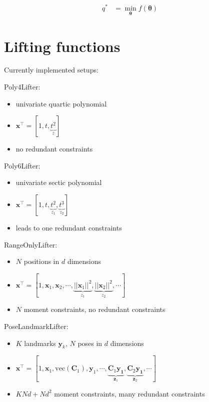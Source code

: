\documentclass[11pt]{article}
\providecommand{\tightlist}{%
  \setlength{\itemsep}{0pt}\setlength{\parskip}{0pt}}
\begin{document}
\begin{align}
q^* &= \min_{\mathbf{\theta}} f(\mathbf{\theta})
\end{align}


\section{Lifting functions}

Currently implemented setups:

Poly4Lifter:

\begin{itemize}
\tightlist
\item univariate quartic polynomial
\item \(\mathbf{x}^\top = [1, t, \underbrace{t^2}_{z}]\)
\item no redundant constraints
\end{itemize}

Poly6Lifter:
\begin{itemize}
\tightlist
\item univariate sectic polynomial
\item \(\mathbf{x}^\top = [1, t, \underbrace{t^2}_{z_1}, \underbrace{t^3}_{z_2}]\)
\item leads to one redundant constraints
\end{itemize}

RangeOnlyLifter:

\begin{itemize}
\tightlist
\item \(N\) positions in \(d\) dimensions
\item \(\mathbf{x}^\top = [1, \mathbf{x}_1, \mathbf{x}_2, \cdots , \underbrace{||\mathbf{x}_1||^2}_{z_1}, \underbrace{||\mathbf{x}_2||^2}_{z_2}, \cdots]\)
\item \(N\) moment constraints, no redundant constraints
\end{itemize}

PoseLandmarkLifter:

\begin{itemize}
\tightlist
\item \(K\) landmarks \(\mathbf{y}_k\), \(N\) poses in \(d\) dimensions
\item \(\mathbf{x}^\top = [1, \mathbf{x}_1, \text{vec}(\mathbf{C}_1), \mathbf{y}_1, \cdots , \underbrace{\mathbf{C}_1\mathbf{y_1}}_{\mathbf{z}_1}, \underbrace{\mathbf{C}_2\mathbf{y_1}}_{\mathbf{z}_2}, \cdots]\)
\item \(KNd + Nd^2\) moment constraints, many redundant constraints
\end{itemize}
\end{document}
